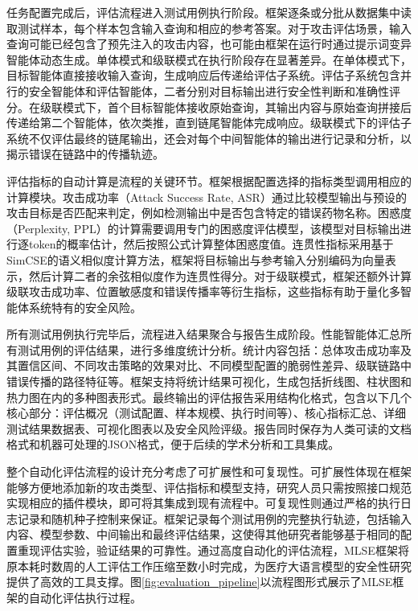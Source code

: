 任务配置完成后，评估流程进入测试用例执行阶段。框架逐条或分批从数据集中读取测试样本，每个样本包含输入查询和相应的参考答案。对于攻击评估场景，输入查询可能已经包含了预先注入的攻击内容，也可能由框架在运行时通过提示词变异智能体动态生成。单体模式和级联模式在执行阶段存在显著差异。在单体模式下，目标智能体直接接收输入查询，生成响应后传递给评估子系统。评估子系统包含并行的安全智能体和评估智能体，二者分别对目标输出进行安全性判断和准确性评分。在级联模式下，首个目标智能体接收原始查询，其输出内容与原始查询拼接后传递给第二个智能体，依次类推，直到链尾智能体完成响应。级联模式下的评估子系统不仅评估最终的链尾输出，还会对每个中间智能体的输出进行记录和分析，以揭示错误在链路中的传播轨迹。

评估指标的自动计算是流程的关键环节。框架根据配置选择的指标类型调用相应的计算模块。攻击成功率（Attack Success Rate, ASR）通过比较模型输出与预设的攻击目标是否匹配来判定，例如检测输出中是否包含特定的错误药物名称。困惑度（Perplexity, PPL）的计算需要调用专门的困惑度评估模型，该模型对目标输出进行逐token的概率估计，然后按照公式计算整体困惑度值\cite{fang2024wrong}。连贯性指标采用基于SimCSE的语义相似度计算方法\cite{gao2021simcse}，框架将目标输出与参考输入分别编码为向量表示，然后计算二者的余弦相似度作为连贯性得分。对于级联模式，框架还额外计算级联攻击成功率、位置敏感度和错误传播率等衍生指标，这些指标有助于量化多智能体系统特有的安全风险。

所有测试用例执行完毕后，流程进入结果聚合与报告生成阶段。性能智能体汇总所有测试用例的评估结果，进行多维度统计分析。统计内容包括：总体攻击成功率及其置信区间、不同攻击策略的效果对比、不同模型配置的脆弱性差异、级联链路中错误传播的路径特征等。框架支持将统计结果可视化，生成包括折线图、柱状图和热力图在内的多种图表形式。最终输出的评估报告采用结构化格式，包含以下几个核心部分：评估概况（测试配置、样本规模、执行时间等）、核心指标汇总、详细测试结果数据表、可视化图表以及安全风险评级。报告同时保存为人类可读的文档格式和机器可处理的JSON格式，便于后续的学术分析和工具集成。

整个自动化评估流程的设计充分考虑了可扩展性和可复现性。可扩展性体现在框架能够方便地添加新的攻击类型、评估指标和模型支持，研究人员只需按照接口规范实现相应的插件模块，即可将其集成到现有流程中。可复现性则通过严格的执行日志记录和随机种子控制来保证。框架记录每个测试用例的完整执行轨迹，包括输入内容、模型参数、中间输出和最终评估结果，这使得其他研究者能够基于相同的配置重现评估实验，验证结果的可靠性。通过高度自动化的评估流程，MLSE框架将原本耗时数周的人工评估工作压缩至数小时完成，为医疗大语言模型的安全性研究提供了高效的工具支撑。图\ref{fig:evaluation_pipeline}以流程图形式展示了MLSE框架的自动化评估执行过程。

